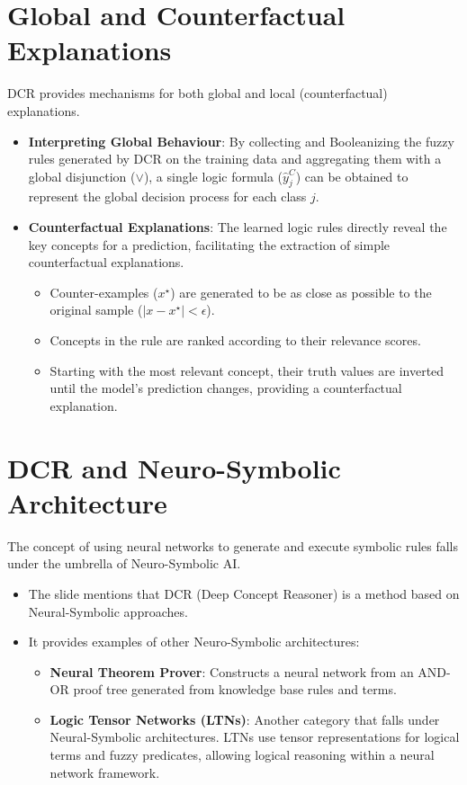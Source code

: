 \documentclass[10pt, oneside]{article}
\begin{document}
\pagebreak

\section{Global and Counterfactual Explanations}
DCR provides mechanisms for both global and local (counterfactual) explanations.

\begin{itemize}
   \item \textbf{Interpreting Global Behaviour}: By collecting and Booleanizing the fuzzy rules generated by DCR on the training data and aggregating them with a global disjunction ($\lor$), a single logic formula ($\hat{y}^C_j$) can be obtained to represent the global decision process for each class $j$.
   \item \textbf{Counterfactual Explanations}: The learned logic rules directly reveal the key concepts for a prediction, facilitating the extraction of simple counterfactual explanations. 
   \begin{itemize}
       \item Counter-examples ($x^\star$) are generated to be as close as possible to the original sample ($|x - x^\star| < \epsilon$).
       \item Concepts in the rule are ranked according to their relevance scores.
       \item Starting with the most relevant concept, their truth values are inverted until the model's prediction changes, providing a counterfactual explanation.
   \end{itemize}
\end{itemize}

\section{DCR and Neuro-Symbolic Architecture}
The concept of using neural networks to generate and execute symbolic rules falls under the umbrella of Neuro-Symbolic AI.

\begin{itemize}
   \item The slide mentions that DCR (Deep Concept Reasoner) is a method based on Neural-Symbolic approaches.
   \item It provides examples of other Neuro-Symbolic architectures: 
   \begin{itemize}
       \item \textbf{Neural Theorem Prover}: Constructs a neural network from an AND-OR proof tree generated from knowledge base rules and terms.
       \item \textbf{Logic Tensor Networks (LTNs)}: Another category that falls under Neural-Symbolic architectures. LTNs use tensor representations for logical terms and fuzzy predicates, allowing logical reasoning within a neural network framework.
   \end{itemize}
\end{itemize}
\end{document}
